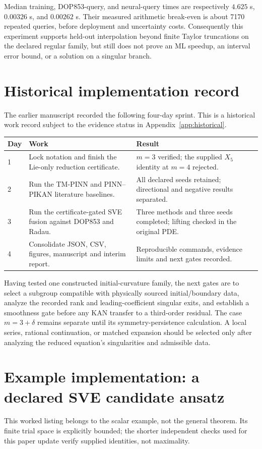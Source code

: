 Median training, DOP853-query, and neural-query times are respectively
$4.625$ s, $0.00326$ s, and $0.00262$ s. Their measured arithmetic break-even
is about 7170 repeated queries, before deployment and uncertainty costs.
Consequently this experiment supports held-out interpolation beyond finite
Taylor truncations on the declared regular family, but still does not prove an
ML speedup, an interval error bound, or a solution on a singular branch.

\section{Historical implementation record}
The earlier manuscript recorded the following four-day sprint. This is a
historical work record subject to the evidence status in Appendix~\ref{app:historical}.
\begin{center}
\small
\begin{tabularx}{\linewidth}{@{}lXX@{}}
\toprule
Day & Work & Result \\
\midrule
1 & Lock notation and finish the Lie-only reduction certificate. &
$m=3$ verified; the supplied $X_5$ identity at $m=4$ rejected. \\
2 & Run the TM-PINN and PINN--PIKAN literature baselines. &
All declared seeds retained; directional and negative results separated. \\
3 & Run the certificate-gated SVE fusion against DOP853 and Radau. &
Three methods and three seeds completed; lifting checked in the original PDE. \\
4 & Consolidate JSON, CSV, figures, manuscript and interim report. &
Reproducible commands, evidence limits and next gates recorded. \\
\bottomrule
\end{tabularx}
\end{center}
Having tested one constructed initial-curvature family, the next gates are to
select a subgroup compatible with physically sourced initial/boundary data,
analyze the recorded rank and leading-coefficient singular exits, and establish
a smoothness gate before any KAN transfer to a third-order residual. The case
$m=3+\delta$ remains separate until its symmetry-persistence calculation. A
local series, rational continuation, or matched expansion should be selected
only after analyzing the reduced equation's singularities and admissible data.


\section{Example implementation: a declared SVE candidate ansatz}
\label{app:sve-listing}
This worked listing belongs to the scalar example, not the general theorem.
Its finite trial space is explicitly bounded; the shorter independent
checks used for this paper update verify supplied identities, not maximality.

